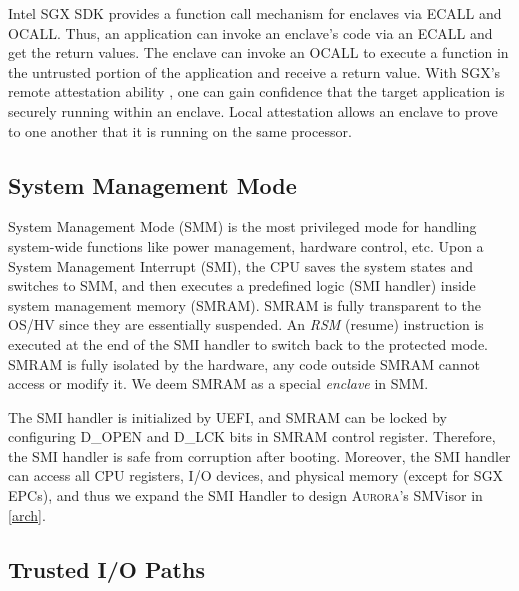 Intel SGX SDK provides a function call mechanism for enclaves via ECALL and OCALL.  Thus, an application can invoke an enclave's code via an ECALL and get the return values. The enclave can invoke an OCALL to execute a function in the untrusted portion of the application and receive a return value. With SGX's remote attestation ability \cite{Anati2013InnovativeTF}, one can gain confidence that the target application is securely running within an enclave. Local attestation allows an enclave to prove to one another that it is running on the same processor.

\subsection{System Management Mode}
System Management Mode (SMM) is the most privileged mode for handling system-wide functions like power management, hardware control, etc. Upon a System Management Interrupt (SMI), the CPU saves the system states and switches to SMM, and then executes a predefined logic (SMI handler) inside system management memory (SMRAM). SMRAM is fully transparent to the OS/HV since they are essentially suspended. An \textit{RSM} (resume) instruction is executed at the end of the SMI handler to switch back to the protected mode.  SMRAM is fully isolated by the hardware, any code outside SMRAM cannot access or modify it. We deem SMRAM as a special \textit{enclave} in SMM.

The SMI handler is initialized by UEFI, and  SMRAM can be locked by configuring D\_OPEN and D\_LCK bits in SMRAM control register. Therefore, the SMI handler is safe from corruption after booting. Moreover, the SMI handler can access all CPU registers, I/O devices, and physical memory (except for SGX EPCs), and thus we expand the SMI Handler to design \textsc{Aurora}'s SMVisor in \autoref{arch}.

\subsection{Trusted I/O Paths}\label{types}

